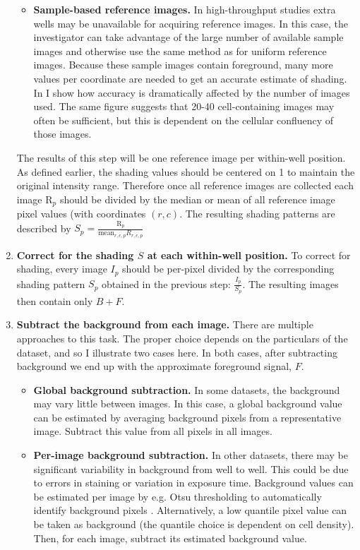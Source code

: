 \begin{enumerate}
\begin{itemize}
\item \textbf{Sample-based reference images.}
In high-throughput studies extra wells may be
unavailable for acquiring reference images.
In this case, the investigator can take advantage
of the large number of available sample images and otherwise
use the same method as for uniform reference images.
Because these sample images contain foreground, many
more values per coordinate are needed to get an
accurate estimate of shading. In 
I show how accuracy is dramatically affected by
the number of images used. The same figure suggests that
20-40 cell-containing images may often be sufficient, but this
is dependent on the cellular confluency of those images. 
\end{itemize}


The results of this step will be one reference image per
within-well position. As defined earlier, the shading values
should be centered on 1 to maintain the original intensity
range. Therefore once all reference images are collected
each image $\text{R}_p$ should be divided by the median
or mean of all reference image pixel values (with coordinates
$(r,c)$. The resulting shading patterns are described by
$S_p=\frac{\text{R}_p}{\text{mean}_{r,c,p} R_{r,c,p}}$


\item \textbf{Correct for the shading $S$ at each
within-well position.} To correct for shading,
every image $I_p$ should be per-pixel divided by
the corresponding shading pattern $S_p$ obtained in
the previous step: $\frac{I_p}{S_p}$. The resulting
images then contain only $B+F$.


\item \textbf{Subtract the background from each image.}
There are multiple approaches to this task.
The proper choice depends on the
particulars of the dataset, and so I illustrate two
cases here. In both cases, after subtracting background
we end up with the approximate foreground signal, $F$.

\begin{itemize}

\item \textbf{Global background subtraction.}
In some datasets, the background may vary little between
images. In this case, a global background value can be
estimated by averaging background pixels from a
representative image. Subtract this value from all pixels
in all images.

\item \textbf{Per-image background subtraction.}
In other datasets, there may be significant variability
in background from well to well. This could be due to errors
in staining or variation in exposure time. 
Background values can be estimated per image
by e.g. Otsu thresholding to automatically identify
background pixels \cite{Otsu1975}. Alternatively, a low
quantile pixel value can be taken as background
(the quantile choice is dependent on cell density).
Then, for each image, subtract its estimated
background value.



\end{itemize}
\end{enumerate}
